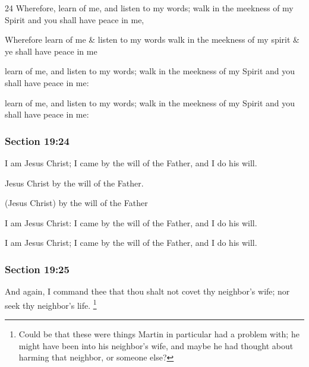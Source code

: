 		\begin{framed}
		\scriptsize
			\begin{compactdesc}
				\item[JSP] 24 Wherefore, learn of me, and listen to my words; walk in the meekness of my Spirit and you shall have peace in me,
				\item[RB1] Wherefore learn of me \& listen to my words walk in the meekness of my spirit \& ye shall have peace in me
				\item[DC 1835] learn of me, and listen to my words; walk in the meekness of my Spirit and you shall have peace in me: 
				\item[DC 1844] learn of me, and listen to my words; walk in the meekness of my Spirit and you shall have peace in me: 
			\end{compactdesc}
		\end{framed}

	\subsubsection{Section 19:24} %
		\label{DC19-24}

		I am Jesus Christ; I came by the will of the Father, and I do his will.

		\begin{framed}
		\scriptsize
			\begin{compactdesc}
				\item[JSP] Jesus Christ by the will of the Father.
				\item[RB1] (Jesus Christ) by the will of the Father
				\item[DC 1835] I am Jesus Christ: I came by the will of the Father, and I do his will.
				\item[DC 1844] I am Jesus Christ; I came by the will of the Father, and I do his will.
			\end{compactdesc}
		\end{framed}

	\subsubsection{Section 19:25} %
		\label{DC19-25}

		And again, I command thee that thou shalt not covet thy neighbor's wife; nor seek thy neighbor's life.%
			\footnote{%
				Could be that these were things Martin in particular had a problem with; he might have been into his neighbor's wife, and maybe he had thought about harming that neighbor, or someone else?
				}

